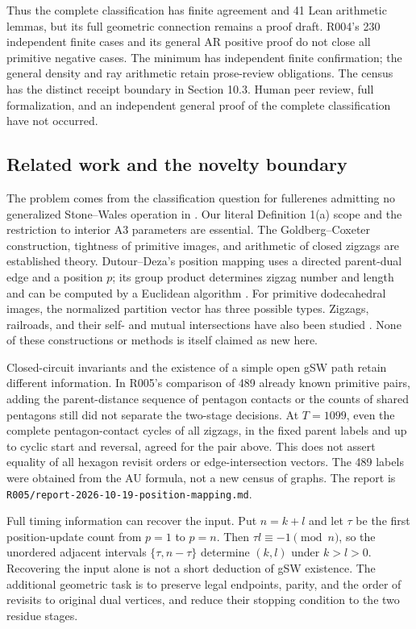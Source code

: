 \documentclass[11pt]{amsart}
\newcommand{\record}[1]{\nolinkurl{#1}}
\begin{document}
Thus the complete classification has finite agreement and 41 Lean
arithmetic lemmas, but its full geometric connection remains a proof
draft. R004's 230 independent finite cases and its general AR positive
proof do not close all primitive negative cases. The minimum has
independent finite confirmation; the general density and ray arithmetic
retain prose-review obligations. The census has the distinct receipt
boundary in Section 10.3. Human peer review, full formalization, and an
independent general proof of the complete classification have not occurred.

\subsection{Related work and the novelty boundary}
The problem comes from the classification question for fullerenes
admitting no generalized Stone--Wales operation in \cite{BBS}. Our
literal Definition 1(a) scope and the restriction to interior A3
parameters are essential. The Goldberg--Coxeter construction,
tightness of primitive images, and arithmetic of closed zigzags are
established theory. Dutour--Deza's position mapping uses a directed
parent-dual edge and a position $p$; its group product determines
zigzag number and length and can be computed by a Euclidean algorithm
\cite[Section 4, Theorems 4.5, 4.12, 6.5 and Proposition 4.14]{DD}.
For primitive dodecahedral images, the normalized partition vector has
three possible types. Zigzags, railroads, and their self- and mutual
intersections have also been studied \cite{ZZ,Knots}. None of these
constructions or methods is itself claimed as new here.

Closed-circuit invariants and the existence of a simple open gSW path
retain different information. In R005's comparison of 489 already
known primitive pairs, adding the parent-distance sequence of pentagon
contacts or the counts of shared pentagons still did not separate
the two-stage decisions. At $T=1099$, even the complete pentagon-contact
cycles of all zigzags, in the fixed parent labels and up to cyclic
start and reversal, agreed for the pair above. This does not assert
equality of all hexagon revisit orders or edge-intersection vectors.
The 489 labels were obtained from the AU formula, not a new census of
graphs. The report is \record{R005/report-2026-10-19-position-mapping.md}.

Full timing information can recover the input. Put $n=k+l$ and let
$\tau$ be the first position-update count from $p=1$ to $p=n$.
Then $\tau l\equiv-1\pmod n$, so the unordered adjacent intervals
$\{\tau,n-\tau\}$ determine $(k,l)$ under $k>l>0$.
Recovering the input alone is not a short deduction of gSW existence.
The additional geometric task is to preserve legal endpoints, parity,
and the order of revisits to original dual vertices, and reduce their
stopping condition to the two residue stages.
\end{document}
